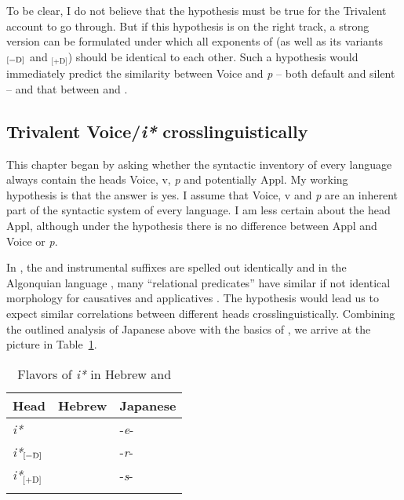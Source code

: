 \begin{exe}
\begin{xlist}
\begin{xlist}
\begin{xlist}
\begin{xlist}
\begin{xlist}
\begin{xlist}
\begin{exe}
\begin{xlist}
\begin{exe}
\begin{exe}
\begin{xlist}
\begin{exe}
\begin{exe}
\begin{xlist}
\begin{exe}
\begin{xlist}
\begin{exe}
\begin{xlist}
\begin{exe}
\begin{xlist}
\begin{exe}
\begin{xlist}
To be clear, I do not believe that the \emph{} hypothesis must be true for the Trivalent account to go through. But if this hypothesis is on the right track, a strong version can be formulated under which all exponents of \emph{} (as well as its variants \emph{}$_{\text{[\textminus{}D]}}$ and \emph{}$_{\text{[+D]}}$) should be identical to each other. Such a hypothesis would immediately predict the similarity between Voice and \emph{p} -- both default and silent -- and that between {\vz} and {\pz}.

	\subsection{Trivalent Voice/\textit{i*} crosslinguistically} \label{i:i:ay} \label{r1:g:1}
This chapter began by asking whether the syntactic inventory of every language always contain the heads Voice, v, \textit{p} and potentially Appl. My working hypothesis is that the answer is yes. I assume that Voice, v and \emph{p} are an inherent part of the syntactic system of every language. I am less certain about the  head Appl, although under the \textit{} hypothesis there is no difference between Appl and Voice or \textit{p}. 

In , the  and instrumental  suffixes are spelled out identically \citep{jerro17} and in the Algonquian language , many ``relational predicates'' have similar if not identical morphology for causatives and applicatives \citep[Section~2.3.7.1]{quinn06phd}. The \emph{} hypothesis would lead us to expect similar correlations between different heads crosslinguistically. Combining the outlined analysis of Japanese above with the basics of \emph{}, we arrive at the picture in Table~\ref{table:heads-langs2}.

\begin{table}
	\begin{tabular}{lll}
 \lsptoprule
	Head 		& Hebrew 	  		& Japanese\\\midrule
	\emph{i*}   	& \tkal          & -\emph{e}-\\
	\emph{i*}$_{\text{[\textminus{}D]}}$ 	& \tnif 		& -\emph{r}-\\
	\emph{i*}$_{\text{[+D]}}$	& \thif		& -\emph{s}-\\
\lspbottomrule
 	\end{tabular}
	\caption{Flavors of \textit{i*} in Hebrew and \label{table:heads-langs2}}
\end{table}


\end{xlist}
\end{exe}
\end{xlist}
\end{exe}
\end{xlist}
\end{exe}
\end{xlist}
\end{exe}
\end{xlist}
\end{exe}
\end{exe}
\end{xlist}
\end{exe}
\end{exe}
\end{xlist}
\end{exe}
\end{xlist}
\end{xlist}
\end{xlist}
\end{xlist}
\end{xlist}
\end{xlist}
\end{exe}
